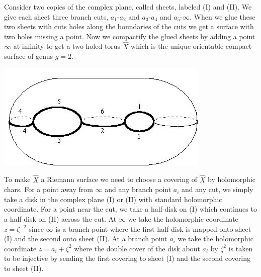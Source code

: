 \documentclass[12pt]{extarticle}
\theoremstyle{definition}
\begin{document}
Consider two copies of the complex plane, called sheets, labeled (I) and (II). We give each sheet three branch cuts, $a_1$-$a_2$ and $a_3$-$a_4$ and $a_5$-$\infty$. 
 When we glue these two sheets with cuts holes along the boundaries of the cuts we get a surface with two holes missing a point. Now we compactify the glued sheets by adding a point $\infty$ at infinity to get a two holed torus $\hat{X}$ which is the unique orientable compact surface of genus $g = 2$.  
\begin{center}
\includegraphics[scale=0.8]{TwoHoledTorus}
\end{center}
To make $\hat{X}$ a Riemann surface we need to choose a covering of $\hat{X}$ by holomorphic chars. For a point away from $\infty$ and any branch point $a_i$ and any cut, we simply take a disk in the complex plane (I) or (II) with standard holomorphic coordinate. For a point near the cut, we take a half-disk on (I) which continues to a half-disk on (II) across the cut. At $\infty$ we take the holomorphic coordinate $z = \zeta^{-2}$ since $\infty$ is a branch point where the first half disk is mapped onto sheet (I) and the second onto sheet (II). At a branch point $a_i$ we take the holomorphic coordinate $z = a_i + \zeta^2$ where the double cover of the disk about $a_i$ by $\zeta^2$ is taken to be injective by sending the first covering to sheet (I) and the second covering to sheet (II). 
\end{document}
